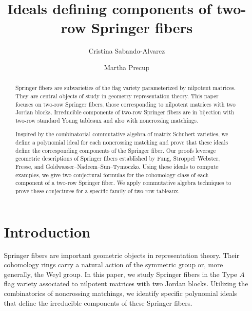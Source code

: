 \documentclass[11pt]{amsart}
\title{Ideals defining components of two-row Springer fibers}
\author{Cristina Sabando-Alvarez}
\author{Martha Precup}
\theoremstyle{remark}
\theoremstyle{remark}
\theoremstyle{definition}
\theoremstyle{definition}
\theoremstyle{definition}
\numberwithin{equation}{section}
\begin{document}
\begin{abstract}  Springer fibers are subvarieties of the flag variety parameterized by nilpotent matrices. They are central objects of study in geometry representation theory. This paper focuses on two-row Springer fibers, those corresponding to nilpotent matrices with two Jordan blocks. Irreducible components of two-row Springer fibers are in bijection with two-row standard Young tableaux and also with noncrossing matchings. 

Inspired by the combinatorial commutative algebra of matrix Schubert varieties, we define a polynomial ideal for each noncrossing matching and prove that these ideals define the corresponding components of the Springer fiber. Our proofs leverage geometric descriptions of Springer fibers established by Fung, Stroppel--Webster, Fresse, and Goldwasser--Nadeem--Sun--Tymoczko.  Using these ideals to compute examples, we give two conjectural formulas for the cohomology class of each component of a two-row Springer fiber. We apply commutative algebra techniques to prove these conjectures for a specific family of two-row tableaux.
\end{abstract}


\maketitle

\setcounter{tocdepth}{1}
\tableofcontents



















\section{Introduction}
Springer fibers are important geometric objects in representation theory. Their cohomology rings carry a natural action of the symmetric group or, more generally, the Weyl group. In this paper, we study Springer fibers in the Type $A$ flag variety associated to nilpotent matrices with two Jordan blocks. Utilizing the combinatorics of noncrossing matchings, we identify specific polynomial ideals that define the irreducible components of these Springer fibers.
\end{document}
